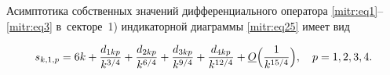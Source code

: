\smallskip



\hypertarget{mitr:th1}{}



\begin{theorem}[1]Асимптотика собственных значений дифференциального оператора \eqref{mitr:eq1}--\eqref{mitr:eq3} в~секторе~{\rm1)} индикаторной диаграммы  \eqref{mitr:eq25} имеет вид

\begin{equation}

\label{mitr:eq36}

s_{k,1,p}={6k}+\frac{d_{1kp}}{k^{3/4}}+

\frac{d_{2kp}}{k^{6/4}}+

\frac{d_{3kp}}{k^{9/4}}+

\frac{d_{4kp}}{k^{12/4}}+

\underline O\Bigl(\frac1{k^{15/4}}\Bigr), \quad

p=1,2,3,4.

\end{equation}

\end{theorem}



\smallskip



